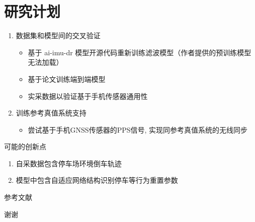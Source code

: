 \documentclass{beamer} %
\begin{document}
\section{研究计划}

\begin{frame}
    \begin{enumerate}
        \item 数据集和模型间的交叉验证
        \begin{itemize}
            \item 基于 ai-imu-dr 模型开源代码重新训练滤波模型（作者提供的预训练模型无法加载）
            \item 基于论文\cite{dugne2021understanding}训练端到端模型
            \item 实采数据以验证基于手机传感器通用性
        \end{itemize}

        \item 训练参考真值系统支持
        \begin{itemize}
            \item 尝试基于手机GNSS传感器的PPS信号, 实现同参考真值系统的无线同步
        \end{itemize}
    \end{enumerate}
\end{frame}

\begin{frame}{可能的创新点}
    \begin{enumerate}
        \item 自采数据包含停车场环境倒车轨迹
        \item 模型中包含自适应网络结构识别停车等行为重置参数
    \end{enumerate}
\end{frame}


\begin{frame}[allowframebreaks]{参考文献} %
	\printbibliography[heading=references]
\end{frame}


\begin{frame}
    \begin{center}
        {\Huge 谢谢}
    \end{center}
\end{frame}
\end{document}
